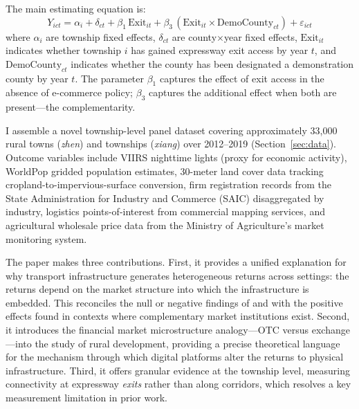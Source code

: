 \documentclass[12pt]{article}
\begin{document}
The main estimating equation is:
\begin{equation}\label{eq:main}
    Y_{ict} = \alpha_i + \delta_{ct} + \beta_1 \, \text{Exit}_{it} + \beta_3 \, (\text{Exit}_{it} \times \text{DemoCounty}_{ct}) + \varepsilon_{ict}
\end{equation}
where $\alpha_i$ are township fixed effects, $\delta_{ct}$ are county$\times$year fixed effects, $\text{Exit}_{it}$ indicates whether township $i$ has gained expressway exit access by year $t$, and $\text{DemoCounty}_{ct}$ indicates whether the county has been designated a demonstration county by year $t$. The parameter $\beta_1$ captures the effect of exit access in the absence of e-commerce policy; $\beta_3$ captures the additional effect when both are present---the complementarity.

I assemble a novel township-level panel dataset covering approximately 33,000 rural towns (\textit{zhen}) and townships (\textit{xiang}) over 2012--2019 (Section~\ref{sec:data}). Outcome variables include VIIRS nighttime lights (proxy for economic activity), WorldPop gridded population estimates, 30-meter land cover data tracking cropland-to-impervious-surface conversion, firm registration records from the State Administration for Industry and Commerce (SAIC) disaggregated by industry, logistics points-of-interest from commercial mapping services, and agricultural wholesale price data from the Ministry of Agriculture's market monitoring system.

The paper makes three contributions. First, it provides a unified explanation for why transport infrastructure generates heterogeneous returns across settings: the returns depend on the market structure into which the infrastructure is embedded. This reconciles the null or negative findings of \citet{faber2014} and \citet{baumsnow2020} with the positive effects found in contexts where complementary market institutions exist. Second, it introduces the financial market microstructure analogy---OTC versus exchange---into the study of rural development, providing a precise theoretical language for the mechanism through which digital platforms alter the returns to physical infrastructure. Third, it offers granular evidence at the township level, measuring connectivity at expressway \textit{exits} rather than along corridors, which resolves a key measurement limitation in prior work.


\end{document}
